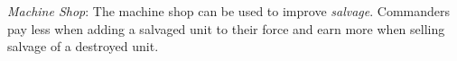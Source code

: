 \emph{Machine Shop}: The machine shop can be used to improve \emph{salvage}.
Commanders pay less when adding a salvaged unit to their force and earn more when selling salvage of a destroyed unit.
